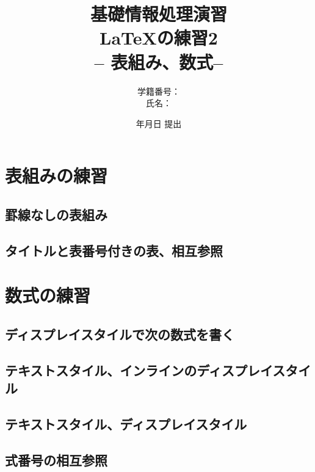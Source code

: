 \documentclass[titlepage]{jarticle}
\begin{document}
\title{基礎情報処理演習\\ \LaTeX の練習2\\ -- 表組み、数式--}
\author{学籍番号：\\
氏名：}
\date{年月日 提出}

\maketitle

\section{表組みの練習}
\subsection{罫線なしの表組み}


\subsection{タイトルと表番号付きの表、相互参照}


\section{数式の練習}
\subsection{ディスプレイスタイルで次の数式を書く}


\subsection{テキストスタイル、インラインのディスプレイスタイル}


\subsection{テキストスタイル、ディスプレイスタイル}


\subsection{式番号の相互参照}
\end{document}
